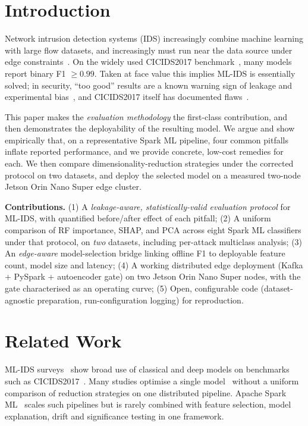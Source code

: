 \documentclass[runningheads]{llncs}
\begin{document}
\section{Introduction}
\label{sec:intro}

Network intrusion detection systems (IDS) increasingly combine machine learning with large flow datasets, and increasingly must run near the data source under edge constraints~\cite{shi2016edge,ring2019survey}. On the widely used CICIDS2017 benchmark~\cite{sharafaldin2018toward}, many models report binary F1 $\geq 0.99$. Taken at face value this implies ML-IDS is essentially solved; in security, ``too good'' results are a known warning sign of leakage and experimental bias~\cite{arp2022dos,kapoor2023leakage,pendlebury2019tesseract}, and CICIDS2017 itself has documented flaws~\cite{engelen2021troubleshooting}.

This paper makes the \emph{evaluation methodology} the first-class contribution, and then demonstrates the deployability of the resulting model. We argue and show empirically that, on a representative Spark ML pipeline, four common pitfalls inflate reported performance, and we provide concrete, low-cost remedies for each. We then compare dimensionality-reduction strategies under the corrected protocol on two datasets, and deploy the selected model on a measured two-node Jetson Orin Nano Super edge cluster.

\textbf{Contributions.}
(1) A \emph{leakage-aware, statistically-valid evaluation protocol} for ML-IDS, with quantified before/after effect of each pitfall;
(2) A uniform comparison of RF importance, SHAP, and PCA across eight Spark ML classifiers under that protocol, on \emph{two} datasets, including per-attack multiclass analysis;
(3) An \emph{edge-aware} model-selection bridge linking offline F1 to deployable feature count, model size and latency;
(4) A working distributed edge deployment (Kafka + PySpark + autoencoder gate) on two Jetson Orin Nano Super nodes, with the gate characterised as an operating curve;
(5) Open, configurable code (dataset-agnostic preparation, run-configuration logging) for reproduction.

\section{Related Work}
\label{sec:related}

ML-IDS surveys~\cite{ring2019survey,khraisat2019survey,ferrag2020deep} show broad use of classical and deep models on benchmarks such as CICIDS2017~\cite{sharafaldin2018toward}. Many studies optimise a single model~\cite{vinayakumar2019deep} without a uniform comparison of reduction strategies on one distributed pipeline. Apache Spark ML~\cite{zaharia2010spark,anderson2017spark} scales such pipelines but is rarely combined with feature selection, model explanation, drift and significance testing in one framework.
\end{document}
